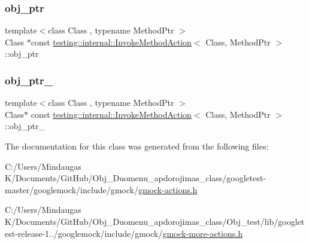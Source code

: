 \subsubsection{\texorpdfstring{obj\_ptr}{obj\_ptr}}
{\footnotesize\ttfamily template$<$class Class , typename Method\+Ptr $>$ \\
Class $\ast$const \mbox{\hyperlink{structtesting_1_1internal_1_1_invoke_method_action}{testing\+::internal\+::\+Invoke\+Method\+Action}}$<$ Class, Method\+Ptr $>$\+::obj\+\_\+ptr}

\mbox{\label{structtesting_1_1internal_1_1_invoke_method_action_ac857e8bad8f6417640145ab1f5740963}} 
\subsubsection{\texorpdfstring{obj\_ptr\_}{obj\_ptr\_}}
{\footnotesize\ttfamily template$<$class Class , typename Method\+Ptr $>$ \\
Class$\ast$ const \mbox{\hyperlink{structtesting_1_1internal_1_1_invoke_method_action}{testing\+::internal\+::\+Invoke\+Method\+Action}}$<$ Class, Method\+Ptr $>$\+::obj\+\_\+ptr\+\_\+\hspace{0.3cm}{\ttfamily [private]}}



The documentation for this class was generated from the following files\+:\begin{DoxyCompactItemize}
\item 
C\+:/\+Users/\+Mindaugas K/\+Documents/\+Git\+Hub/\+Obj\+\_\+\+Duomenu\+\_\+apdorojimas\+\_\+class/googletest-\/master/googlemock/include/gmock/\mbox{\hyperlink{googletest-master_2googlemock_2include_2gmock_2gmock-actions_8h}{gmock-\/actions.\+h}}\item 
C\+:/\+Users/\+Mindaugas K/\+Documents/\+Git\+Hub/\+Obj\+\_\+\+Duomenu\+\_\+apdorojimas\+\_\+class/\+Obj\+\_\+test/lib/googletest-\/release-\/1../googlemock/include/gmock/\mbox{\hyperlink{_obj__test_2lib_2googletest-release-1_88_81_2googlemock_2include_2gmock_2gmock-more-actions_8h}{gmock-\/more-\/actions.\+h}}\end{DoxyCompactItemize}
